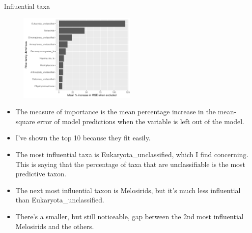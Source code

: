 \documentclass{beamer}
\begin{document}
\begin{frame}{Influential taxa}

  \begin{center}
    \begin{figure}
      \includegraphics[width=2.25in]{w_ribs/families_rib_PercIncMSE_barchart}
    \end{figure}
  \end{center}
  
  {\scriptsize
    \begin{itemize}
    \item The measure of importance is the mean percentage increase in
      the mean-square error of model predictions when the variable is
      left out of the model.
    \item I've shown the top 10 because they fit easily.
    \item The most influential taxa is Eukaryota\_unclassified, which I find
    concerning.  This is saying that the percentage of taxa that are
    unclassifiable is the most predictive taxon.
    \item The next most influential taxon is Melosirids, but it's much less
    influential than Eukaryota\_unclassified.
    \item There's a smaller, but still noticeable, gap
      between the 2nd most influential Melosirids and the others.
    \end{itemize}
  }

\end{frame}
\end{document}
